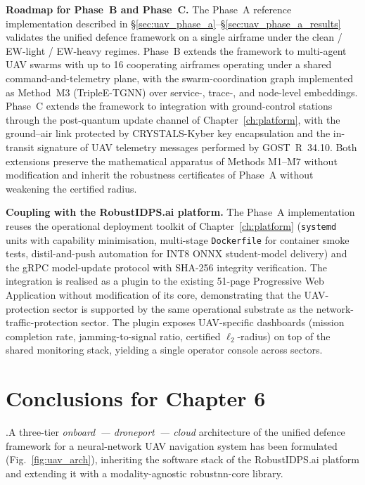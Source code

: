 \noindent\textbf{Roadmap for Phase~B and Phase~C.} The Phase~A
reference implementation described in
\S\ref{sec:uav_phase_a}--\S\ref{sec:uav_phase_a_results} validates
the unified defence framework on a single airframe under the
clean / EW-light / EW-heavy regimes. Phase~B extends the framework
to multi-agent UAV swarms with up to 16 cooperating airframes
operating under a shared command-and-telemetry plane, with the
swarm-coordination graph implemented as Method~M3 (TripleE-TGNN)
over service-, trace-, and node-level embeddings. Phase~C extends
the framework to integration with ground-control stations through
the post-quantum update channel of Chapter~\ref{ch:platform}, with
the ground--air link protected by CRYSTALS-Kyber key encapsulation
and the in-transit signature of UAV telemetry messages performed
by GOST~R~34.10. Both extensions preserve the mathematical
apparatus of Methods M1--M7 without modification and inherit the
robustness certificates of Phase~A without weakening the certified
radius.

\noindent\textbf{Coupling with the RobustIDPS.ai platform.} The
Phase~A implementation reuses the operational deployment toolkit
of Chapter~\ref{ch:platform} (\texttt{systemd} units with
capability minimisation, multi-stage \texttt{Dockerfile} for
container smoke tests, distil-and-push automation for INT8 ONNX
student-model delivery) and the gRPC model-update protocol with
SHA-256 integrity verification. The integration is realised as a
plugin to the existing 51-page Progressive Web Application without
modification of its core, demonstrating that the UAV-protection
sector is supported by the same operational substrate as the
network-traffic-protection sector. The plugin exposes UAV-specific
dashboards (mission completion rate, jamming-to-signal ratio,
certified $\ell_2$-radius) on top of the shared monitoring stack,
yielding a single operator console across sectors.

\section{Conclusions for Chapter 6}
\label{sec:uav_summary}

.\quad A three-tier \emph{onboard~--- droneport~--- cloud}
architecture of the unified defence framework for a neural-network
UAV navigation system has been formulated (Fig.~\ref{fig:uav_arch}),
inheriting the software stack of the \textsf{RobustIDPS.ai} platform
and extending it with a modality-agnostic \textsf{robustnn-core}
library.

